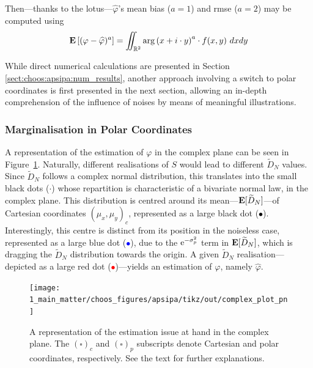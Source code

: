 Then---thanks to the \gls{lotus}---$\widehat{\varphi}$'s mean bias ($a=1$) and \gls{rmse} ($a=2$) may be computed using
\begin{equation}\label{eq:choos:apsipa:bias_rmse_cartesian}
	\esp\left[(\varphi - \widehat{\varphi})^{a} \right] = \iint_{\mathbb{R}^2} \arg\left(x + i \cdot y\right)^{a}\cdot f(x,y)\ dxdy
\end{equation}

While direct numerical calculations are presented in Section \ref{sect:choos:apsipa:num_results}, another approach involving a switch to polar coordinates is first presented in the next section, allowing an in-depth comprehension of the influence of noises by means of meaningful illustrations.

\subsubsection{Marginalisation in Polar Coordinates}

A representation of the estimation of $\varphi$ in the complex plane can be seen in Figure~\ref{fig:choos:apsipa:complex_plane_expl}. Naturally, different realisations of $S$ would lead to different $\widetilde{D}_N$ values. Since $\widetilde{D}_N$ follows a complex normal distribution, this translates into the small black dots ($\cdot$) whose repartition is characteristic of a bivariate normal law, in the complex plane. This distribution is centred around its mean---$\mathbf{E}[\widetilde{D}_N]$---of Cartesian coordinates $(\mu_x, \mu_y)_c$, represented as a large black dot (\textcolor{black}{$\bullet$}). Interestingly, this centre is distinct from its position in the noiseless case, represented as a large blue dot (\textcolor{blue}{$\bullet$}), due to the $\mathrm{e}^{-\sigma_p^2}$ term in $\mathbf{E}[\widetilde{D}_N]$, which is dragging the $\widetilde{D}_N$ distribution towards the origin. A given $\widetilde{D}_N$ realisation---depicted as a large red dot (\textcolor{red}{$\bullet$})---yields an estimation of $\varphi$, namely $\widehat{\varphi}$.

\begin{figure}
	\centering
	\texttt{[image: 1\_main\_matter/choos\_figures/apsipa/tikz/out/complex\_plot\_pn]}
	\caption{A representation of the estimation issue at hand in the complex plane. The $\left(\square\right)_c$ and $\left(\square\right)_p$ subscripts denote Cartesian and polar coordinates, respectively. See the text for further explanations.}
	\label{fig:choos:apsipa:complex_plane_expl}
\end{figure}

